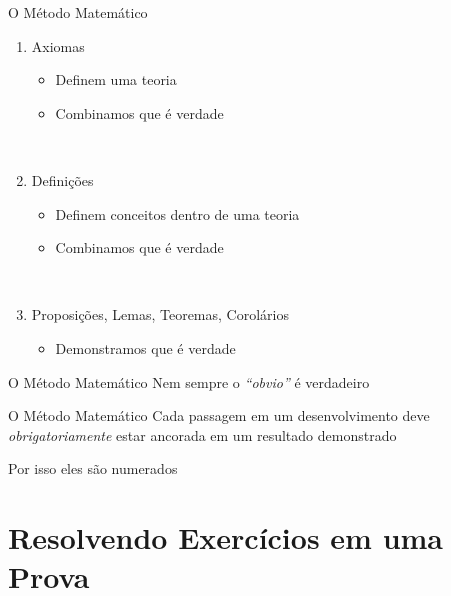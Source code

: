 \begin{frame}{O Método Matemático}
  \begin{enumerate}[<+->]
    \item Axiomas
    \begin{itemize}
      \item Definem uma teoria
      \item Combinamos que é verdade
    \end{itemize}
    ~

    \item Definições
    \begin{itemize}
      \item Definem conceitos dentro de uma teoria
      \item Combinamos que é verdade
    \end{itemize}
    ~

    \item Proposições, Lemas, Teoremas, Corolários
    \begin{itemize}
      \item Demonstramos que é verdade
    \end{itemize}
  \end{enumerate}
\end{frame}

\begin{frame}{O Método Matemático}
  Nem sempre o \textit{``obvio''} é verdadeiro
\end{frame}

\begin{frame}{O Método Matemático}
  Cada passagem em um desenvolvimento deve \\
  \emph{obrigatoriamente}
  estar ancorada em um resultado demonstrado

  \pause
  \vspace{\baselineskip}
  Por isso eles são numerados
\end{frame}

\section{Resolvendo Exercícios em uma Prova}

